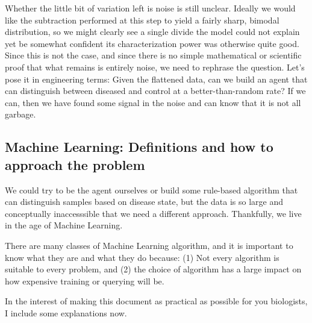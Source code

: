 \documentclass[]{article}
\begin{document}
  Whether the little bit of variation left is noise is still unclear. Ideally we would like the subtraction performed at this step to yield a fairly sharp, bimodal distribution, so we might clearly see a single divide the model could not explain yet be somewhat confident its characterization power was otherwise quite good. Since this is not the case, and since there is no simple mathematical or scientific proof that what remains is entirely noise, we need to rephrase the question. Let's pose it in engineering terms: Given the flattened data, can we build an agent that can distinguish between diseased and control at a better-than-random rate? If we can, then we have found some signal in the noise and can know that it is not all garbage.

  \subsection{Machine Learning: Definitions and how to approach the problem}

  We could try to be the agent ourselves or build some rule-based algorithm that can distinguish samples based on disease state, but the data is so large and conceptually inaccesssible that we need a different approach. Thankfully, we live in the age of Machine Learning.

  There are many classes of Machine Learning algorithm, and it is important to know what they are and what they do because: (1) Not every algorithm is suitable to every problem, and (2) the choice of algorithm has a large impact on how expensive training or querying will be.

  In the interest of making this document as practical as possible for you biologists, I include some explanations now.
\end{document}
